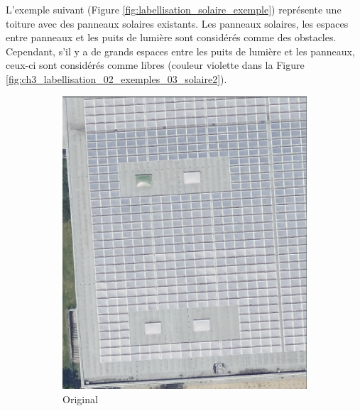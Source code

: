 L'exemple suivant (Figure \ref{fig:labellisation_solaire_exemple}) représente une toiture avec des panneaux solaires existants. Les panneaux solaires, les espaces entre panneaux et les puits de lumière sont considérés comme des obstacles. Cependant, s'il y a de grands espaces entre les puits de lumière et les panneaux, ceux-ci sont considérés comme libres (couleur violette dans la Figure \ref{fig:ch3_labellisation_02_exemples_03_solaire2}).

\begin{figure}[H]
    \centering
    \begin{subfigure}[b]{0.49\textwidth}
        \centering
        \includegraphics[width=\textwidth]{02-main/figures/ch3/ch3_labellisation_02_exemples_03_solaire1.png}
        \caption{Original}
        \label{fig:ch3_labellisation_02_exemples_03_solaire1}
    \end{subfigure}
    \hfill
    \begin{subfigure}[b]{0.49\textwidth}
        \centering

\end{subfigure}
\end{figure}
